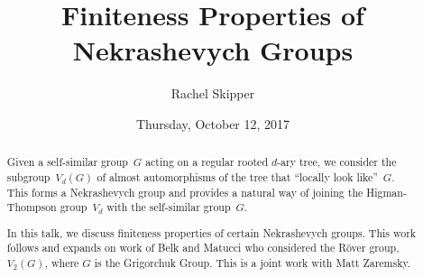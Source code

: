 \documentclass{UAmathtalk}
\author{Rachel Skipper}
\title{Finiteness Properties of\\ Nekrashevych Groups}
\date{Thursday, October 12, 2017}
\begin{document}
\maketitle

\begin{abstract}
Given a self-similar group~$G$ acting on a regular rooted $d$-ary tree, we
consider the subgroup~$V_d(G)$ of almost automorphisms of the tree that
``locally look like''~$G$. This forms a Nekrashevych group and provides a
natural way of joining the Higman-Thompson group~$V_d$ with the self-similar
group~$G$.

\hspace{-.25em}In this talk, we discuss finiteness properties of certain Nekrashevych
groups. This work follows and expands on work of Belk and Matucci who
considered the Röver group, $V_2(G)$, where $G$ is the Grigorchuk Group.
This is a joint work with Matt Zaremsky.
\end{abstract}
\end{document}
